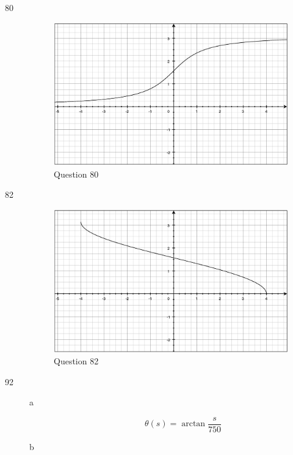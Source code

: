 \documentclass[fleqn,addpoints]{exam}
\newcommand{\degree}{\ensuremath{^\circ}}
\begin{document}
\begin{description}
\item[80] 
\begin{figure}[H]
  \centering
  \includegraphics[scale=.3]{question_80.eps}
  \caption*{Question 80}
\end{figure}

\item[82] 
\begin{figure}[H]
  \centering
  \includegraphics[scale=.3]{question_82.eps}
  \caption*{Question 82}
\end{figure}

\item[92]
\begin{description}

\item[a]
\[
  \theta(s) = \arctan \frac{s}{750} 
\]

\item[b]


\end{description}
\end{description}
\end{document}
